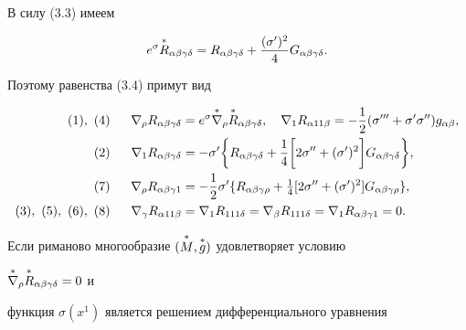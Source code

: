 \begin{notes} 


В силу (3.3) имеем 


$$ 


e^\sigma\up{R}_{\alpha\beta\gamma\delta}= 


R_{\alpha\beta\gamma\delta}+\frac{(\sigma')^2}{4} 


G_{\alpha\beta\gamma\delta}. 


$$ 


Поэтому равенства (3.4) примут вид 


\begin{alignat*}{2} 


(1),\ (4&) &\ \; \nabla_\rho R_{\alpha\beta\gamma\delta}&= 


e^\sigma\up{\nabla}_\rho\up{R}_{\alpha\beta\gamma\delta},\quad 


\nabla_1 R_{\alpha 11\beta}=-\frac{1}{2} 


(\sigma'''+\sigma'\sigma'')g_{\alpha\beta},\\ 


(2&) &\ \; \nabla_1 R_{\alpha\beta\gamma\delta}&= 


-\sigma'\bigg\{R_{\alpha\beta\gamma\delta}+\frac{1}{4} 


\bigg[2\sigma''+(\sigma')^2\bigg]G_{\alpha\beta\gamma\delta} 


\bigg\},\\ 


(7&) &\ \; \nabla_\rho R_{\alpha\beta\gamma 1}&= 


-\frac{1}{2}\sigma'\{R_{\alpha\beta\gamma\rho}+ 


\tfrac{1}{4}[2\sigma''+(\sigma')^2] 


G_{\alpha\beta\gamma\rho}\},\\ 


(3),\ (5),\ (6),\ (8&) &\ \; \nabla_\gamma 


R_{\alpha 11\beta}&=\nabla_1 R_{111\delta}= 


\nabla_\beta R_{111\delta}= 


\nabla_1 R_{\alpha\beta\gamma 1}=0. 


\end{alignat*}


Если риманово многообразие $(\overset{*}{M}{},\overset{*}{g}{})$ удовлетворяет условию 


$\overset{*}{\nabla}{}_\rho\overset{*}{R}{}_{\alpha\beta\gamma\delta}=0$ и 


функция $\sigma(x^1)$ является решением дифференциального уравнения 



\end{notes}
